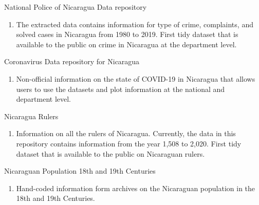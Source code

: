 \documentclass[a4paper, 10pt]{article}
\renewenvironment{itemize}{
  \begin{list}{}
    { \setlength{\itemsep}{5pt}
      \setlength{\parsep}{0pt}
      \setlength{\topsep}{0pt}
      \setlength{\leftmargin}{0em} } }{
  \end{list}}
\begin{document}
\begin{itemize}
   National Police of Nicaragua Data repository \href{https://github.com/RRMaximiliano/policia-nacional-nic-stats}{\faGithub}
   \begin{enumerate}[label = {-}]
    \item The extracted data contains information for type of crime, complaints, and solved cases in Nicaragua from 1980 to 2019. First tidy dataset that is available to the public on crime in Nicaragua at the department level. 
   \end{enumerate}
   Coronavirus Data repository for Nicaragua \href{https://github.com/RRMaximiliano/observatorio-covid-nicaragua}{\faGithub}
   \begin{enumerate}[label = {-}]
    \item Non-official information on the state of COVID-19 in Nicaragua that allows users to use the datasets and plot information at the national and department level. 
   \end{enumerate}
   Nicaragua Rulers \href{https://github.com/RRMaximiliano/observatorio-covid-nicaragua}{\faGithub}
   \begin{enumerate}[label = {-}]
    \item Information on all the rulers of Nicaragua. Currently, the data in this repository contains information from the year 1,508 to 2,020. First tidy dataset that is available to the public on Nicaraguan rulers.
   \end{enumerate}
   Nicaraguan Population 18th and 19th Centuries \href{https://github.com/RRMaximiliano/poblacion-nicaragua-siglo-18-19}{\faGithub}
   \begin{enumerate}[label = {-}]
    \item Hand-coded information form archives on the Nicaraguan population in the 18th and 19th Centuries.
   \end{enumerate}
\end{itemize}

\end{document}
